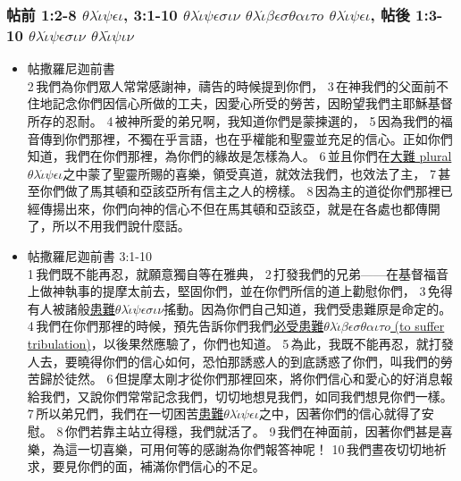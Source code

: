  \subsubsection{帖前 1:2-8 $\theta$$\lambda$$\acute{\iota}$$\psi$$\epsilon$$\iota$, 3:1-10 $\theta$$\lambda$$\acute{\iota}$$\psi$$\epsilon$$\sigma$$\iota$$\nu$ $\theta$$\lambda$$\acute{\iota}$$\beta$$\epsilon$$\sigma$$\theta$$\alpha$$\iota$$\tau$$o$ $\theta$$\lambda$$\acute{\iota}$$\psi$$\epsilon$$\iota$, 帖後 1:3-10 $\theta$$\lambda$$\acute{\iota}$$\psi$$\epsilon$$\sigma$$\iota$$\nu$ $\theta$$\lambda$$\tilde{\iota}$$\psi$$\iota$$\nu$} 
 \begin{itemize} 
\itemsep-.25em
\item{帖撒羅尼迦前書}\\ 2 我們為你們眾人常常感謝神，禱告的時候提到你們， 3 在神我們的父面前不住地記念你們因信心所做的工夫，因愛心所受的勞苦，因盼望我們主耶穌基督所存的忍耐。 4 被神所愛的弟兄啊，我知道你們是蒙揀選的， 5 因為我們的福音傳到你們那裡，不獨在乎言語，也在乎權能和聖靈並充足的信心。正如你們知道，我們在你們那裡，為你們的緣故是怎樣為人。 6 並且你們在\underline{大難 plural $\theta$$\lambda$$\acute{\iota}$$\psi$$\epsilon$$\iota$}之中蒙了聖靈所賜的喜樂，領受真道，就效法我們，也效法了主， 7 甚至你們做了馬其頓和亞該亞所有信主之人的榜樣。 8 因為主的道從你們那裡已經傳揚出來，你們向神的信心不但在馬其頓和亞該亞，就是在各處也都傳開了，所以不用我們說什麼話。
 \item{帖撒羅尼迦前書 3:1-10}\\
 1 我們既不能再忍，就願意獨自等在雅典， 2 打發我們的兄弟——在基督福音上做神執事的提摩太前去，堅固你們，並在你們所信的道上勸慰你們， 3 免得有人被諸般\underline{患難$\theta$$\lambda$$\acute{\iota}$$\psi$$\epsilon$$\sigma$$\iota$$\nu$}搖動。因為你們自己知道，我們受患難原是命定的。 4 我們在你們那裡的時候，預先告訴你們我們\underline{必受患難$\theta$$\lambda$$\acute{\iota}$$\beta$$\epsilon$$\sigma$$\theta$$\alpha$$\iota$$\tau$$o$ (to suffer tribulation)}，以後果然應驗了，你們也知道。 5 為此，我既不能再忍，就打發人去，要曉得你們的信心如何，恐怕那誘惑人的到底誘惑了你們，叫我們的勞苦歸於徒然。 6 但提摩太剛才從你們那裡回來，將你們信心和愛心的好消息報給我們，又說你們常常記念我們，切切地想見我們，如同我們想見你們一樣。 7 所以弟兄們，我們在一切困苦\underline{患難$\theta$$\lambda$$\acute{\iota}$$\psi$$\epsilon$$\iota$}之中，因著你們的信心就得了安慰。 8 你們若靠主站立得穩，我們就活了。 9 我們在神面前，因著你們甚是喜樂，為這一切喜樂，可用何等的感謝為你們報答神呢！ 10 我們晝夜切切地祈求，要見你們的面，補滿你們信心的不足。

\end{itemize}
